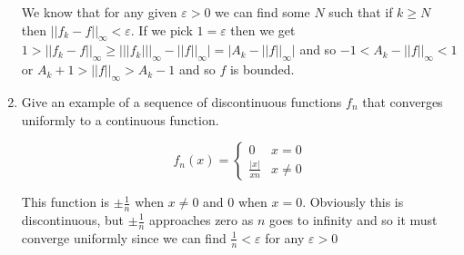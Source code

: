 \documentclass[letterpaper]{article}
\begin{document}
\begin{enumerate}
We know that for any given $\varepsilon>0$ we can find some $N$ such that if $k\ge N$ then $||f_k-f||_\infty<\varepsilon$. If we pick $1=\varepsilon$ then we get $1>||f_k-f||_\infty\ge |||f_k|||_\infty-||f||_\infty|=|A_k-||f||_\infty|$ and so $-1<A_k-||f||_\infty<1$ or $A_k+1>||f||_\infty>A_k-1$ and so $f$ is bounded.
\setcounter{enumi}{8}
\item
Give an example of a sequence of discontinuous functions $f_n$ that converges uniformly to a continuous function.

\[f_n(x)=\begin{cases}0&x=0\\\frac{|x|}{xn}&x\ne 0\end{cases}\]

This function is $\pm\frac{1}{n}$ when $x\ne 0$ and $0$ when $x=0$. Obviously this is discontinuous, but $\pm\frac{1}{n}$ approaches zero as $n$ goes to infinity and so it must converge uniformly since we can find $\frac{1}{n}<\varepsilon$ for any $\varepsilon>0$
\end{enumerate}
\end{document}
